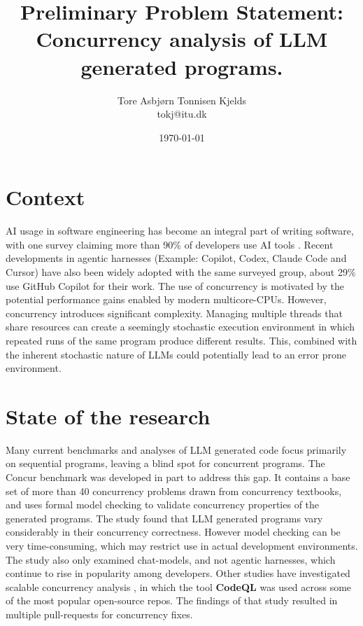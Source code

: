 \documentclass[12pt,a4paper]{article}
\title{Preliminary Problem Statement: Concurrency analysis of LLM generated programs.}
\author{Tore Asbjørn Tonnisen Kjelds \\ tokj@itu.dk}
\date{\today}
\begin{document}
\maketitle

\section{Context}
AI usage in software engineering has become an integral part of writing software, with one survey claiming more than 90\% of developers use AI tools \cite{jetbrains2025developer}. Recent developments in agentic harnesses (Example: Copilot, Codex, Claude Code and Cursor) have also been widely adopted with the same surveyed group, about 29\% use GitHub Copilot for their work.\newline 
The use of concurrency is motivated by the potential performance gains enabled by modern multicore-CPUs. However, concurrency introduces significant complexity. Managing multiple threads that share resources can create a seemingly stochastic execution environment in which repeated runs of the same program produce different results. This, combined with the inherent stochastic nature of LLMs could potentially lead to an error prone environment.

\section{State of the research}
Many current benchmarks and analyses of LLM generated code focus primarily on sequential programs, leaving a blind spot for concurrent programs. The Concur benchmark \cite{huang2026concur} was developed in part to address this gap. It contains a base set of more than 40 concurrency problems drawn from concurrency textbooks, and uses formal model checking to validate concurrency properties of the generated programs. \newline
The study found that LLM generated programs vary considerably in their concurrency correctness. However model checking can be very time-consuming, which may restrict use in actual development environments. The study also only examined chat-models, and not agentic harnesses, which continue to rise in popularity among developers. \newline
Other studies have investigated scalable concurrency analysis \cite{jåtten2025scalablethreadsafetyanalysisjava}, in which the tool \textbf{CodeQL} was used across some of the most popular open-source repos. The findings of that study resulted in multiple pull-requests for concurrency fixes. 
  
\end{document}
